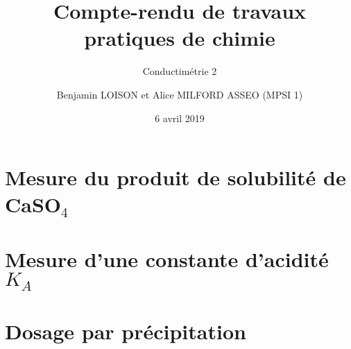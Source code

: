 \documentclass{scrartcl}
\begin{document}
	\title{\vspace{-2cm}Compte-rendu de travaux pratiques de chimie}
	\subtitle{Conductimétrie 2}
	\author{Benjamin LOISON et Alice MILFORD ASSEO (MPSI 1)}
	\date{6 avril 2019}
	\maketitle

  \setcounter{section}{1}
	\section{Mesure du produit de solubilité de CaSO$_4$}
		
		
		
	\section{Mesure d'une constante d'acidité $K_A$}
	
		
	
	\section{Dosage par précipitation}
	
		
			
\end{document}
